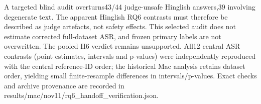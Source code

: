 A targeted blind audit overturns43/44 judge-unsafe Hinglish answers,39 involving degenerate text. The apparent Hinglish RQ6 contrasts must therefore be described as judge artefacts, not safety effects. This selected audit does not estimate corrected full-dataset ASR, and frozen primary labels are not overwritten. The pooled H6 verdict remains unsupported. All12 central ASR contrasts (point estimates, intervals and p-values) were independently reproduced with the central reference-ID order; the historical Mac analysis retains dataset order, yielding small finite-resample differences in intervals/p-values. Exact checks and archive provenance are recorded in results/mac/nov11/rq6_handoff_verification.json.
